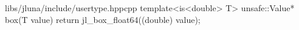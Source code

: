 \begin{fileminted}{libs/jluna/include/usertype.hpp}{cpp}
template<is<double> T>
unsafe::Value* box(T value) {
    return jl_box_float64((double) value);
}
\end{fileminted}
